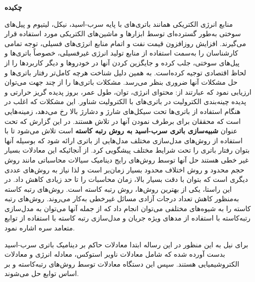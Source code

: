 \thispagestyle{empty}
%

\vspace{-2cm}
\begin{center}
\textbf{\large \textcolor{BrickRed}{چکیده} }
\end{center}

منابع انرژی الکتریکی همانند باتری‌‌‌های با پایه سرب-اسید، نیکل، لیتیوم و پیل‌‌‌های سوختی به‌‌‌طور گسترده‌‌‌ای توسط ابزارها و ماشین‌‌‌های الکتریکی مورد استفاده قرار می‌‌‌گیرند. افزایش روزافزون قیمت نفت و اتمام منابع انرژی‌‌‌های فسیلی، توجه تمامی کارشناسان را به‌‌‌سمت استفاده از منابع تولید انرژی غیرفسیلی، خصوصاً باتری‌‌‌ها و پیل‌‌‌های سوختی، جلب کرده و جایگزین کردن آنها در خودروها و دیگر کاربردها را از لحاظ اقتصادی توجیه کرده‌‌‌است. به همین دلیل شناخت هرچه کامل‌تر رفتار باتری‌ها و حل مشکلات آنها ضروری بنظر می‌رسد. مشکلات باتری‌ها را از چند جهت می‌توان ارزیابی نمود که عبارتند از: محتوای انرژی، توان، طول عمر، بروز پدیده گریز حرارتی و پدیده چینه‌‌‌بندی الکترولیت در باتری‌‌‌های با الکترولیت شناور. 
این مشکلات که اغلب در هنگام استفاده از باتری‌ها تحت سیکل‌های شارژ و دشارژ بالا رخ می‌دهد، زمینه‌هایی است که محققان برای برطرف نمودن آنها در تلاش هستند.
در این گزارش که تحت عنوان
\textbf{شبیه‌سازی باتری سرب-اسید به روش رتبه کاسته}
است تلاش می‌شود تا با استفاده از روش‌های مدل‌سازی مختلف مدل‌هایی از باتری ارائه شود که بوسیله آنها بتوان رفتار باتری را تحت شرایط مختلف پیشگویی کرد.  از آنجائیکه این معادلات بسیار غیر خطی هستند حل آنها توسط روش‌های رایج دینامیک سیالات محاسباتی مانند روش حجم محدود و روش اختلاف محدود بسیار زمان‌بر است
 و لذا نیاز به روش‌های عددی دیگری است که بتوان با دقت بسیار بالا، زمان محاسبات را تا حد زیادی کاهش داد.
در این راستا، یکی از بهترین روش‌ها، روش رتبه کاسته%
است. روش‌های رتبه کاسته به‌منظور کاهش تعداد درجات آزادی مسائل غیرخطی به‌کار می‌روند.
روش‌های رتبه کاسته را به شیوه‌های مختلفی می‌توان انجام داد که از جمله آنها می‌توان به مدل‌سازی رتبه‌کاسته با استفاده از مدهای ویژه جریان و مدل‌سازی رتبه کاسته با استفاده از توابع متعامد سره %
 اشاره نمود.

  برای نیل به این منظور در این رساله ابتدا معادلات حاکم بر دینامیک باتری سرب-اسید بدست آورده شده که شامل معادلات ناویر استوکس، معادله انرژی و معادلات الکتروشیمیایی هستند. سپس این دستگاه معادلات توسط روش‌های رتبه‌کاسته و بر اساس توابع  حل می‌شوند.
 
